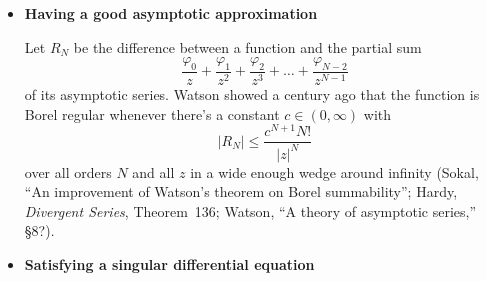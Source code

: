 \documentclass{article}
\begin{document}
\begin{itemize}
\item \textbf{Having a good asymptotic approximation}

Let $R_N$ be the difference between a function and the partial sum
\[ \frac{\varphi_0}{z} + \frac{\varphi_1}{z^2} + \frac{\varphi_2}{z^3} + \ldots + \frac{\varphi_{N-2}}{z^{N-1}} \]
of its asymptotic series. Watson showed a century ago that the function is Borel regular whenever there's a constant $c \in (0, \infty)$ with
\[ |R_N| \le \frac{c^{N+1} N!}{|z|^N} \]
over all orders $N$ and all $z$ in a wide enough wedge around infinity (Sokal, ``An improvement of Watson's theorem on Borel summability''; Hardy, {\em Divergent Series}, Theorem~136; Watson, ``A theory of asymptotic series,'' \S 8?).
\color{DarkBlue}

\item \textbf{Satisfying a singular differential equation}


\end{itemize}
\end{document}
